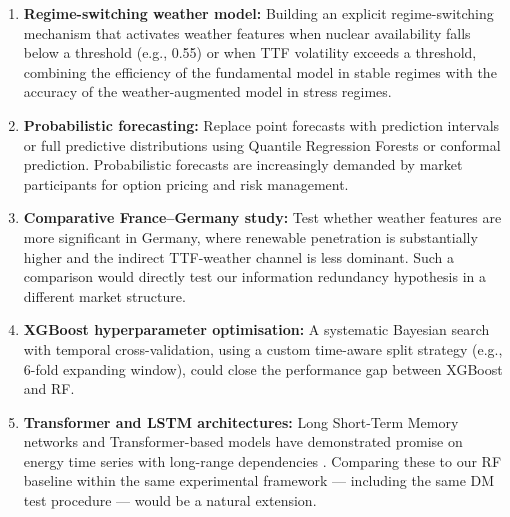 \begin{enumerate}
  \item \textbf{Regime-switching weather model:} Building an explicit
  regime-switching mechanism that activates weather features when nuclear
  availability falls below a threshold (e.g., 0.55) or when TTF volatility
  exceeds a threshold, combining the efficiency of the fundamental model in
  stable regimes with the accuracy of the weather-augmented model in stress
  regimes.

  \item \textbf{Probabilistic forecasting:} Replace point forecasts with
  prediction intervals or full predictive distributions using Quantile
  Regression Forests or conformal prediction. Probabilistic forecasts are
  increasingly demanded by market participants for option pricing and risk
  management.

  \item \textbf{Comparative France--Germany study:} Test whether weather
  features are more significant in Germany, where renewable penetration is
  substantially higher and the indirect TTF-weather channel is less dominant.
  Such a comparison would directly test our information redundancy hypothesis
  in a different market structure.

  \item \textbf{XGBoost hyperparameter optimisation:} A systematic Bayesian
  search with temporal cross-validation, using a custom time-aware split
  strategy (e.g., 6-fold expanding window), could close the performance gap
  between XGBoost and RF.

  \item \textbf{Transformer and LSTM architectures:} Long Short-Term Memory
  networks and Transformer-based models have demonstrated promise on energy
  time series with long-range dependencies \citep{lago2018}. Comparing these
  to our RF baseline within the same experimental framework — including the
  same DM test procedure — would be a natural extension.
\end{enumerate}
